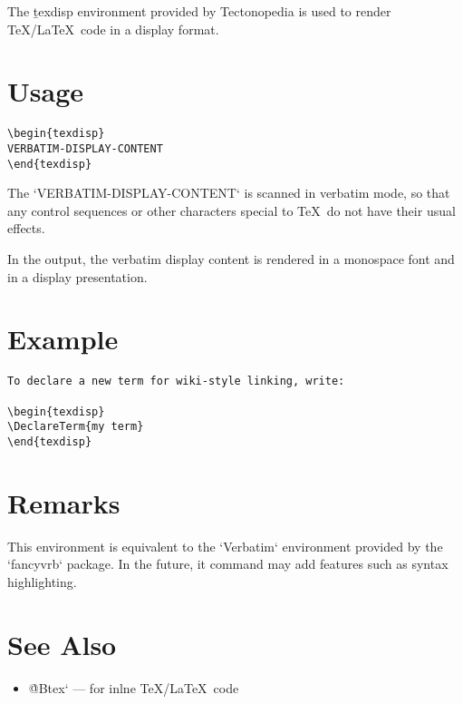 
The \b{texdisp} environment provided by Tectonopedia is used to render
\TeX/\LaTeX\ code in a display format.

\section*{Usage}

\begin{Verbatim}
\begin{texdisp}
VERBATIM-DISPLAY-CONTENT
\end{texdisp}
\end{Verbatim}

The \tex`VERBATIM-DISPLAY-CONTENT` is scanned in verbatim mode, so that any
control sequences or other characters special to \TeX\ do not have their usual
effects.

In the output, the verbatim display content is rendered in a monospace font and
in a display presentation.

\section*{Example}

\begin{Verbatim}
To declare a new term for wiki-style linking, write:

\begin{texdisp}
\DeclareTerm{my term}
\end{texdisp}
\end{Verbatim}
    
\section*{Remarks}

This environment is equivalent to the \tex`Verbatim` environment provided by the
\tex`fancyvrb` package. In the future, it command may add features such as
syntax highlighting.

\section*{See Also}

\begin{itemize}
\item \`@Btex` — for inlne \TeX/\LaTeX\ code
\end{itemize}
